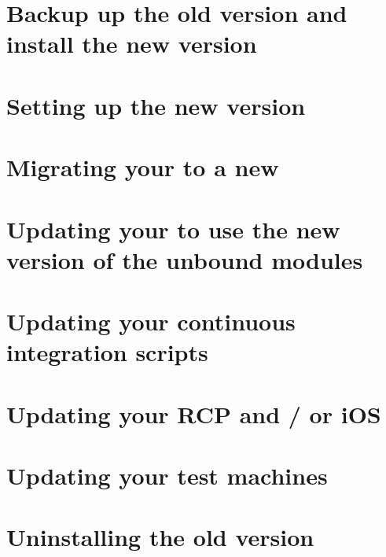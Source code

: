 \section{Backup up the old version and install the new version}


\section{Setting up the new version}


\section{Migrating your \gdprojects{} to a new \gddb{}}


\section{Updating your \gdprojects{} to use the new version of the unbound modules}


\section{Updating your continuous integration scripts}


\section{Updating your RCP and / or iOS \gdauts{}}


\section{Updating your test machines}


\section{Uninstalling the old version}

